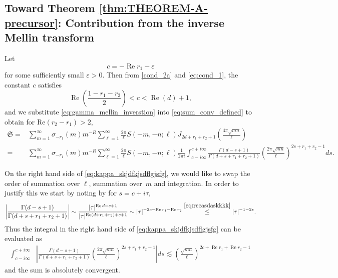 \documentclass[]{article}
\renewcommand{\Re}{\operatorname{Re}}
\newcommand{\mathcalSsumdef}{\mathfrak{S}}
\begin{document}
\subsection{Toward Theorem \ref{thm:THEOREM-A-precursor}: Contribution from the inverse Mellin transform}\label{sec:InvMellin}





Let 
\begin{equation}
    c = - \Re r_1 - \varepsilon
\end{equation}
for some sufficiently small $\varepsilon>0$. Then from \eqref{cond_2a} and \eqref{eq:cond_1}, the constant $c$ satisfies 
\begin{equation}\label{eq:recasdaskkkk}
   \Re ( \frac{1-r_1-r_2}{2} )  < c < \Re (d) +1, 
\end{equation}
and we  substitute \eqref{eq:gamma_mellin_inverstion}  into  \eqref{eq:sum_conv_defined} %
to obtain for $\text{Re}(r_2-r_1)>2$,  
\begin{equation}\label{eq:kappa_skjdfkjsdflgjsfg}
	\begin{split}
	\mathcalSsumdef =& \sum_{m=1}^\infty \sigma_{-r_1}(m) m^{-R}  \sum_{\ell=1}^\infty \frac{2 \pi }{\ell} S(-m,-n; \ell)  J_{2d+r_1+r_2+1} ( \tfrac{4 \pi \sqrt{mn}}{\ell})\\
    =& \sum_{m=1}^\infty \sigma_{-r_1}(m) m^{-R}  \sum_{\ell=1}^\infty \frac{2 \pi }{\ell} S(-m,-n; \ell) 	\frac{1}{2 \pi i} \int_{c-i \infty}^{c+i \infty}   \frac{   \Gamma(d-s+1)  }{\Gamma (d+s+r_1+r_2+1)  }      \left( \frac{2 \pi \sqrt{mn}}{\ell} \right)^{2s+r_1+r_2-1} ds. 
	\end{split}
\end{equation}


On the right hand side of \eqref{eq:kappa_skjdfkjsdflgjsfg}, we would like to swap the order of  summation over $\ell$, summation over~$m$ and integration. In order to justify this we start by noting by \cite[5.11.9]{NIST}
 for $s = c + i \tau$, \begin{equation}\label{eq:fractions_of_gamma_slskldkjfjjfwew}
    \begin{split}
         \left| \frac{   \Gamma(d-s+1)  }{\Gamma (d+s+r_1+r_2+1)  } \right|   \sim \frac{|\tau|^{\Re d-c +1}}{|\tau|^{\Re (d+r_1+r_2)+c+1}} \sim |\tau|^{-2c- \Re r_1- \Re r_2} \stackrel{\eqref{eq:recasdaskkkk}}{\le} |\tau|^{-1-2 \varepsilon}.
    \end{split}
\end{equation}
Thus the integral in the right hand side of \eqref{eq:kappa_skjdfkjsdflgjsfg} can be evaluated as 
\begin{equation}
\begin{split}
 \int_{c-i \infty}^{c+i \infty}& \left|  \frac{   \Gamma(d-s+1)  }{\Gamma (d+s+r_1+r_2+1)  }      \left( \frac{2 \pi \sqrt{mn}}{\ell} \right)^{2s+r_1+r_2-1} \right| ds  
\lesssim\left( \frac{\sqrt{mn}}{\ell} \right)^{2 c+\Re r_1+\Re 
r_2-1}
\end{split}
\end{equation}
and the sum is absolutely convergent.
\end{document}

